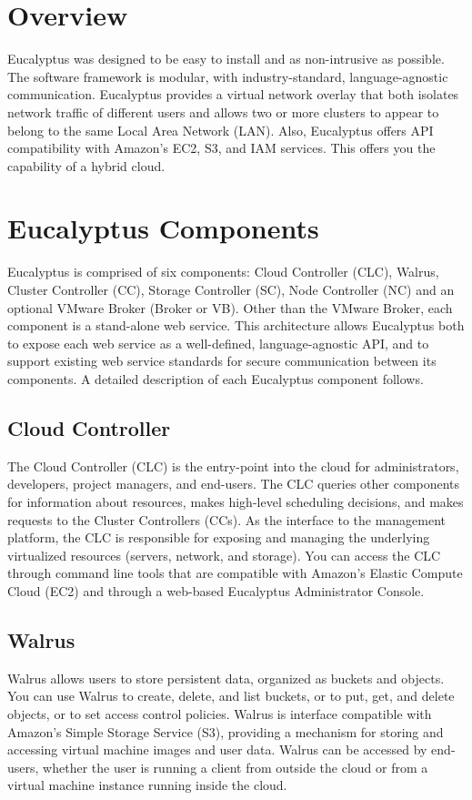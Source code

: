 \section{Overview}
Eucalyptus was designed to be easy to install and as non-intrusive as possible. The software framework is modular, with industry-standard, language-agnostic communication. Eucalyptus provides a virtual network overlay that both isolates network traffic of different users and allows two or more clusters to appear to belong to the same Local Area Network (LAN). Also, Eucalyptus offers API compatibility with Amazon’s EC2, S3, and IAM services. This offers you the capability of a hybrid cloud.

\section{Eucalyptus Components}
Eucalyptus is comprised of six components: Cloud Controller (CLC), Walrus, Cluster Controller (CC), Storage Controller (SC), Node Controller (NC) and an optional VMware Broker (Broker or VB). Other than the VMware Broker, each component is a stand-alone web service. This architecture allows Eucalyptus both to expose each web service as a well-defined, language-agnostic API, and to support existing web service standards for secure communication between its components.
A detailed description of each Eucalyptus component follows.\linebreak
\subsection{Cloud Controller}
The Cloud Controller (CLC) is the entry-point into the cloud for administrators, developers, project managers, and end-users. The CLC queries other components for information about resources, makes high-level scheduling decisions, and makes requests to the Cluster Controllers (CCs). As the interface to the management platform, the CLC is responsible for exposing and managing the underlying virtualized resources (servers, network, and storage). You can access the CLC through command line tools that are compatible with Amazon’s Elastic Compute Cloud (EC2) and through a web-based Eucalyptus Administrator Console.
\subsection{Walrus}
Walrus allows users to store persistent data, organized as buckets and objects. You can use Walrus to create, delete, and list buckets, or to put, get, and delete objects, or to set access control policies. Walrus is interface compatible with Amazon’s Simple Storage Service (S3), providing a mechanism for storing and accessing virtual machine images and user data. Walrus can be accessed by end-users, whether the user is running a client from outside the cloud or from a virtual machine instance running inside the cloud.
